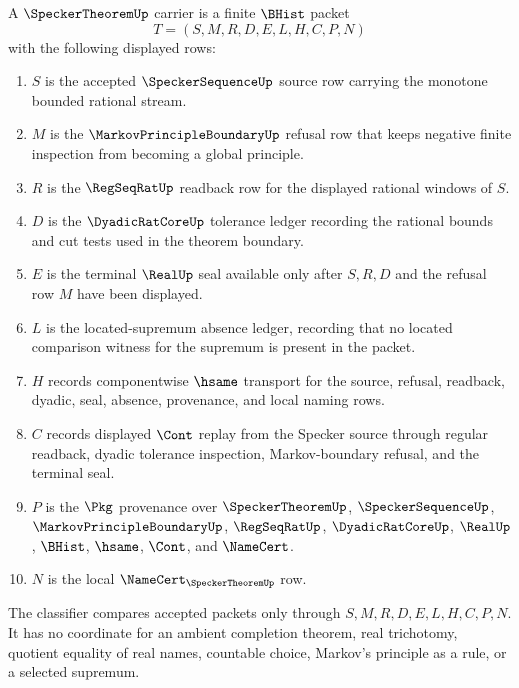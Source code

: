 \begin{definition}
\label{def:specker-theorem-carrier}
A $\SpeckerTheoremUp$ carrier is a finite $\BHist$ packet
$$
T=(S,M,R,D,E,L,H,C,P,N)
$$
with the following displayed rows:
\begin{enumerate}
\item $S$ is the accepted $\SpeckerSequenceUp$ source row carrying the monotone bounded rational stream.
\item $M$ is the $\MarkovPrincipleBoundaryUp$ refusal row that keeps negative finite inspection from becoming a global principle.
\item $R$ is the $\RegSeqRatUp$ readback row for the displayed rational windows of $S$.
\item $D$ is the $\DyadicRatCoreUp$ tolerance ledger recording the rational bounds and cut tests used in the theorem boundary.
\item $E$ is the terminal $\RealUp$ seal available only after $S,R,D$ and the refusal row $M$ have been displayed.
\item $L$ is the located-supremum absence ledger, recording that no located comparison witness for the supremum is present in the packet.
\item $H$ records componentwise $\hsame$ transport for the source, refusal, readback, dyadic, seal, absence, provenance, and local naming rows.
\item $C$ records displayed $\Cont$ replay from the Specker source through regular readback, dyadic tolerance inspection, Markov-boundary refusal, and the terminal seal.
\item $P$ is the $\Pkg$ provenance over $\SpeckerTheoremUp$, $\SpeckerSequenceUp$, $\MarkovPrincipleBoundaryUp$, $\RegSeqRatUp$, $\DyadicRatCoreUp$, $\RealUp$, $\BHist$, $\hsame$, $\Cont$, and $\NameCert$.
\item $N$ is the local $\NameCert_{\SpeckerTheoremUp}$ row.
\end{enumerate}
The classifier compares accepted packets only through $S,M,R,D,E,L,H,C,P,N$. It has no coordinate for an ambient completion theorem, real trichotomy, quotient equality of real names, countable choice, Markov's principle as a rule, or a selected supremum.
\end{definition}

